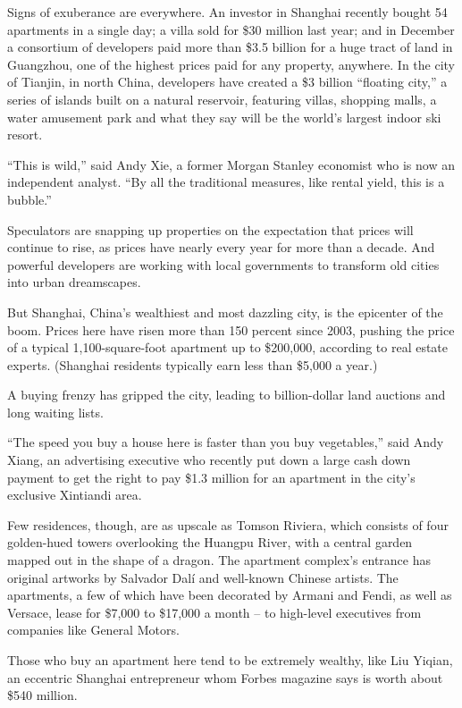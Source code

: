 ﻿\documentclass[12pt]{article}
\begin{document}
Signs of exuberance are everywhere. An investor in Shanghai recently bought 54 apartments in a
single day; a villa sold for \$30 million last year; and in December a consortium of developers paid
more than \$3.5 billion for a huge tract of land in Guangzhou, one of the highest prices paid for
any property, anywhere. In the city of Tianjin, in north China, developers have created a \$3
billion ``floating city,'' a series of islands built on a natural reservoir, featuring villas,
shopping malls, a water amusement park and what they say will be the world's largest indoor ski
resort.

``This is wild,'' said Andy Xie, a former Morgan Stanley economist who is now an independent
analyst. ``By all the traditional measures, like rental yield, this is a bubble.''

Speculators are snapping up properties on the expectation that prices will continue to rise, as
prices have nearly every year for more than a decade. And powerful developers are working with local
governments to transform old cities into urban dreamscapes.

But Shanghai, China's wealthiest and most dazzling city, is the epicenter of the boom. Prices here
have risen more than 150 percent since 2003, pushing the price of a typical 1,100-square-foot
apartment up to \$200,000, according to real estate experts. (Shanghai residents typically earn less
than \$5,000 a year.)

A buying frenzy has gripped the city, leading to billion-dollar land auctions and long waiting
lists.

``The speed you buy a house here is faster than you buy vegetables,'' said Andy Xiang, an
advertising executive who recently put down a large cash down payment to get the right to pay \$1.3
million for an apartment in the city's exclusive Xintiandi area.

Few residences, though, are as upscale as Tomson Riviera, which consists of four golden-hued towers
overlooking the Huangpu River, with a central garden mapped out in the shape of a dragon. The
apartment complex's entrance has original artworks by Salvador Dalí and well-known Chinese artists.
The apartments, a few of which have been decorated by Armani and Fendi, as well as Versace, lease
for \$7,000 to \$17,000 a month -- to high-level executives from companies like General Motors.

Those who buy an apartment here tend to be extremely wealthy, like Liu Yiqian, an eccentric Shanghai
entrepreneur whom Forbes magazine says is worth about \$540 million.
\end{document}
